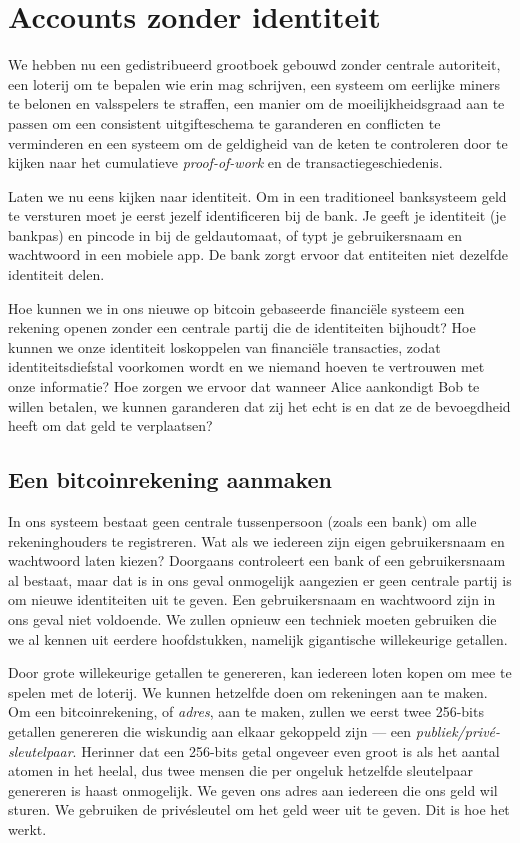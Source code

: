 \chapter{Accounts zonder identiteit}

We hebben nu een gedistribueerd grootboek gebouwd zonder centrale autoriteit, een loterij om te bepalen wie erin mag schrijven, een systeem om eerlijke miners te belonen en valsspelers te straffen, een manier om de moeilijkheidsgraad aan te passen om een consistent uitgifteschema te garanderen en conflicten te verminderen en een systeem om de geldigheid van de keten te controleren door te kijken naar het cumulatieve \textit{proof-of-work} en de transactiegeschiedenis.

Laten we nu eens kijken naar identiteit. Om in een traditioneel banksysteem geld te versturen moet je eerst jezelf identificeren bij de bank. Je geeft je identiteit (je bankpas) en pincode in bij de geldautomaat, of typt je gebruikersnaam en wachtwoord in een mobiele app. De bank zorgt ervoor dat entiteiten niet dezelfde identiteit delen.

Hoe kunnen we in ons nieuwe op bitcoin gebaseerde financiële systeem een rekening openen zonder een centrale partij die de identiteiten bijhoudt? Hoe kunnen we onze identiteit loskoppelen van financiële transacties, zodat identiteitsdiefstal voorkomen wordt en we niemand hoeven te vertrouwen met onze informatie? Hoe zorgen we ervoor dat wanneer Alice aankondigt Bob te willen betalen, we kunnen garanderen dat zij het echt is en dat ze de bevoegdheid heeft om dat geld te verplaatsen?

\section{Een bitcoinrekening aanmaken}

In ons systeem bestaat geen centrale tussenpersoon (zoals een bank) om alle rekeninghouders te registreren. Wat als we iedereen zijn eigen gebruikersnaam en wachtwoord laten kiezen? Doorgaans controleert een bank of een gebruikersnaam al bestaat, maar dat is in ons geval onmogelijk aangezien er geen centrale partij is om nieuwe identiteiten uit te geven. Een gebruikersnaam en wachtwoord zijn in ons geval niet voldoende. We zullen opnieuw een techniek moeten gebruiken die we al kennen uit eerdere hoofdstukken, namelijk gigantische willekeurige getallen. 

Door grote willekeurige getallen te genereren, kan iedereen loten kopen om mee te spelen met de loterij. We kunnen hetzelfde doen om rekeningen aan te maken. Om een bitcoinrekening, of \textit{adres}, aan te maken, zullen we eerst twee 256-bits getallen genereren die wiskundig aan elkaar gekoppeld zijn --- een \textit{publiek/privé-sleutelpaar}. Herinner dat een 256-bits getal ongeveer even groot is als het aantal atomen in het heelal, dus twee mensen die per ongeluk hetzelfde sleutelpaar genereren is haast onmogelijk. We geven ons adres aan iedereen die ons geld wil sturen. We gebruiken de privésleutel om het geld weer uit te geven. Dit is hoe het werkt.

